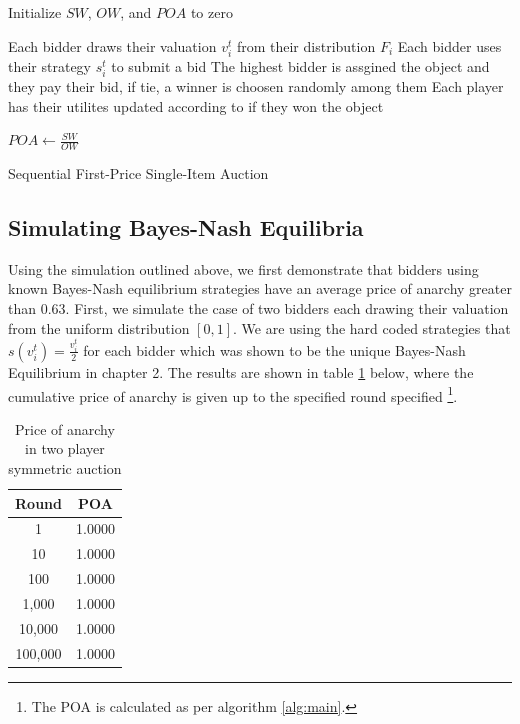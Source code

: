 \documentclass[12pt,twoside]{reedthesis}
\begin{document}
\begin{algorithm}[H]
	Initialize $SW$, $OW$, and $POA$ to zero\\
	{
		Each bidder draws their valuation $v^t_i$ from their distribution $F_i$\;
		Each bidder uses their strategy $s^t_i$ to submit a bid\;
		The highest bidder is assgined the object and they pay their bid, if tie, a winner is choosen randomly among them\;
		Each player has their utilites updated according to if they won the object\;
	
		$POA \leftarrow \frac{SW}{OW}$	
	}
\caption{Sequential First-Price Single-Item Auction}
\label{alg:main}
\end{algorithm}


\subsection{Simulating Bayes-Nash Equilibria}
Using the simulation outlined above, we first demonstrate that bidders using known Bayes-Nash equilibrium strategies have an average price of anarchy greater than $0.63$. First, we simulate the case of two bidders each drawing their valuation from the uniform distribution $[0,1]$. We are using the hard coded strategies that $s(v^t_i) = \frac{v^t_i}{2}$ for each bidder which was shown to be the unique Bayes-Nash Equilibrium in chapter 2. The results are shown in table \ref{table:1} below, where the cumulative price of anarchy is given up to the specified round specified 
\footnote{The POA is calculated as per algorithm \ref{alg:main}. %
}.

\begin{table}[h!]
\begin{center}
\begin{tabular}{ |c|c| }
	\hline
	Round & POA \\
	\hline
	1 & 1.0000 \\
	10 & 1.0000 \\
	100 & 1.0000 \\
	1,000 & 1.0000 \\
	10,000 & 1.0000 \\
	100,000 & 1.0000 \\
	\hline
\end{tabular}
\caption{Price of anarchy in two player symmetric auction}
\label{table:1}
\end{center} 
\end{table}
\end{document}
